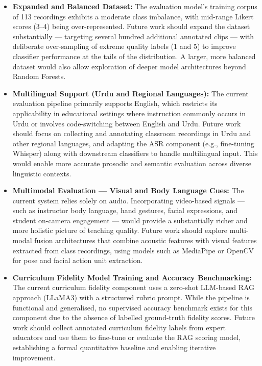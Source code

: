 \begin{itemize}

    \item \textbf{Expanded and Balanced Dataset:} The evaluation model's training corpus of 113 recordings exhibits a moderate class imbalance, with mid-range Likert scores (3--4) being over-represented. Future work should expand the dataset substantially — targeting several hundred additional annotated clips — with deliberate over-sampling of extreme quality labels (1 and 5) to improve classifier performance at the tails of the distribution. A larger, more balanced dataset would also allow exploration of deeper model architectures beyond Random Forests.

    \item \textbf{Multilingual Support (Urdu and Regional Languages):} The current evaluation pipeline primarily supports English, which restricts its applicability in educational settings where instruction commonly occurs in Urdu or involves code-switching between English and Urdu. Future work should focus on collecting and annotating classroom recordings in Urdu and other regional languages, and adapting the ASR component (e.g., fine-tuning Whisper) along with downstream classifiers to handle multilingual input. This would enable more accurate prosodic and semantic evaluation across diverse linguistic contexts.

    \item \textbf{Multimodal Evaluation — Visual and Body Language Cues:} The current system relies solely on audio. Incorporating video-based signals — such as instructor body language, hand gestures, facial expressions, and student on-camera engagement — would provide a substantially richer and more holistic picture of teaching quality. Future work should explore multi-modal fusion architectures that combine acoustic features with visual features extracted from class recordings, using models such as MediaPipe or OpenCV for pose and facial action unit extraction.

    \item \textbf{Curriculum Fidelity Model Training and Accuracy Benchmarking:} The current curriculum fidelity component uses a zero-shot LLM-based RAG approach (LLaMA3) with a structured rubric prompt. While the pipeline is functional and generalised, no supervised accuracy benchmark exists for this component due to the absence of labelled ground-truth fidelity scores. Future work should collect annotated curriculum fidelity labels from expert educators and use them to fine-tune or evaluate the RAG scoring model, establishing a formal quantitative baseline and enabling iterative improvement.


\end{itemize}
